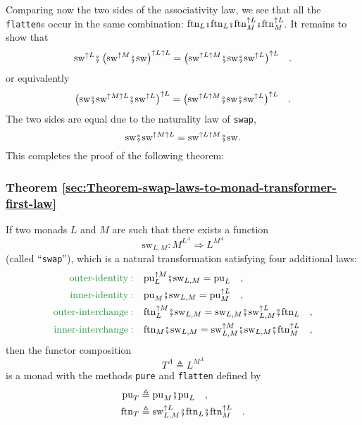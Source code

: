 Comparing now the two sides of the associativity law, we see that
all the \lstinline!flatten!s
occur in the same combination: $\text{ftn}_{L}\bef\text{ftn}_{L}\bef\text{ftn}_{M}^{\uparrow L}\bef\text{ftn}_{M}^{\uparrow L}$.
It remains to show that 
\[
\text{sw}^{\uparrow L}\bef\left(\text{sw}^{\uparrow M}\bef\text{sw}\right)^{\uparrow L\uparrow L}=\big(\text{sw}^{\uparrow L\uparrow M}\bef\text{sw}\bef\text{sw}^{\uparrow L}\big)^{\uparrow L}\quad.
\]
or equivalently
\[
\left(\text{sw}\bef\text{sw}^{\uparrow M\uparrow L}\bef\text{sw}^{\uparrow L}\right)^{\uparrow L}=\big(\text{sw}^{\uparrow L\uparrow M}\bef\text{sw}\bef\text{sw}^{\uparrow L}\big)^{\uparrow L}\quad.
\]
The two sides are equal due to the naturality law of \texttt{}\lstinline!swap!,
\[
\text{sw}\bef\text{sw}^{\uparrow M\uparrow L}=\text{sw}^{\uparrow L\uparrow M}\bef\text{sw}.
\]
This completes the proof of the following theorem:

\subsubsection{Theorem \label{sec:Theorem-swap-laws-to-monad-transformer-first-law}\ref{sec:Theorem-swap-laws-to-monad-transformer-first-law}}

If two monads $L$ and $M$ are such that there exists a function
\[
\text{sw}_{L,M}:M^{L^{A}}\Rightarrow L^{M^{A}}
\]
(called ``\lstinline!swap!''),
which is a natural transformation satisfying four additional laws:
\begin{align*}
{\color{greenunder}\text{outer-identity}:}\quad & \text{pu}_{L}^{\uparrow M}\bef\text{sw}_{L,M}=\text{pu}_{L}\quad,\\
{\color{greenunder}\text{inner-identity}:}\quad & \text{pu}_{M}\bef\text{sw}_{L,M}=\text{pu}_{M}^{\uparrow L}\quad,\\
{\color{greenunder}\text{outer-interchange}:}\quad & \text{ftn}_{L}^{\uparrow M}\bef\text{sw}_{L,M}=\text{sw}_{L,M}\bef\text{sw}_{L,M}^{\uparrow L}\bef\text{ftn}_{L}\quad,\\
{\color{greenunder}\text{inner-interchange}:}\quad & \text{ftn}_{M}\bef\text{sw}_{L,M}=\text{sw}_{L,M}^{\uparrow M}\bef\text{sw}_{L,M}\bef\text{ftn}_{M}^{\uparrow L}\quad,
\end{align*}
then the functor composition
\[
T^{A}\triangleq L^{M^{A}}
\]
is a monad with the methods \lstinline!pure!
and \lstinline!flatten!
defined by
\begin{align}
\text{pu}_{T} & \triangleq\text{pu}_{M}\bef\text{pu}_{L}\quad,\label{eq:def-pure-T-via-pure-L-and-pure-M}\\
\text{ftn}_{T} & \triangleq\text{sw}_{L,M}^{\uparrow L}\bef\text{ftn}_{L}\bef\text{ftn}_{M}^{\uparrow L}\quad.\label{eq:def-flatten-T-via-sw-and-flatten-L-M}
\end{align}


